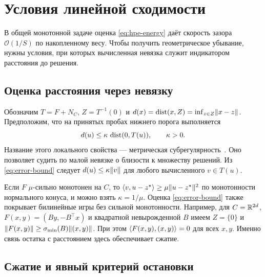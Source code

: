 \section{Условия линейной сходимости}\label{sec:linear}

В общей монотонной задаче оценка \eqref{eq:hpe-energy} даёт скорость
зазора $\mathcal O(1/S)$ по накопленному весу. Чтобы получить
геометрическое убывание, нужны условия, при которых вычисленная
невязка служит индикатором расстояния до решения.

\subsection{Оценка расстояния через невязку}

Обозначим $T=F+N_C$, $Z=T^{-1}(0)$ и
$d(x)=\operatorname{dist}(x,Z)=\inf_{z\in Z}\lVert x-z\rVert$.
Предположим, что на принятых пробах нижнего порога выполняется
\begin{equation}\label{eq:error-bound}
 d(u)\le\kappa\,\operatorname{dist}(0,T(u)),\qquad \kappa>0.
\end{equation}
Название этого локального свойства --- метрическая
субрегулярность~\cite{leventhal}. Оно позволяет судить по малой
невязке о близости к множеству решений.
Из \eqref{eq:error-bound} следует $d(u)\le\kappa\lVert v\rVert$
для любого вычисленного $v\in T(u)$.

Если $F$ $\mu$-сильно монотонен на $C$, то
$\langle v,u-z^\star\rangle\ge\mu\lVert u-z^\star\rVert^2$ по монотонности
нормального конуса, и можно взять $\kappa=1/\mu$.
Оценка \eqref{eq:error-bound} также покрывает билинейные игры
без сильной монотонности. Например, для $C=\mathbb R^{2d}$,
$F(x,y)=(By,-B^\top x)$ и квадратной невырожденной $B$ имеем
$Z=\{0\}$ и $\lVert F(x,y)\rVert\ge\sigma_{\min}(B)\lVert (x,y)\rVert$.
При этом $\langle F(x,y),(x,y)\rangle=0$ для всех $x,y$.
Именно связь остатка с расстоянием здесь обеспечивает сжатие.

\subsection{Сжатие и явный критерий остановки}

